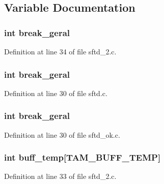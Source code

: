 \subsection{Variable Documentation}
\hypertarget{group__SFTD_gadd34d8f0c83196f8b20622a06ddead79}{
\subsubsection[{break\_\-geral}]{\setlength{\rightskip}{0pt plus 5cm}int {\bf break\_\-geral}}}
\label{group__SFTD_gadd34d8f0c83196f8b20622a06ddead79}


Definition at line 34 of file sftd\_\-2.c.

\hypertarget{group__SFTD_gadd34d8f0c83196f8b20622a06ddead79}{
\subsubsection[{break\_\-geral}]{\setlength{\rightskip}{0pt plus 5cm}int {\bf break\_\-geral}}}
\label{group__SFTD_gadd34d8f0c83196f8b20622a06ddead79}


Definition at line 30 of file sftd.c.

\hypertarget{group__SFTD_gadd34d8f0c83196f8b20622a06ddead79}{
\subsubsection[{break\_\-geral}]{\setlength{\rightskip}{0pt plus 5cm}int {\bf break\_\-geral}}}
\label{group__SFTD_gadd34d8f0c83196f8b20622a06ddead79}


Definition at line 30 of file sftd\_\-ok.c.

\hypertarget{group__SFTD_gaf04e37b7953920f8142c8ebf2b9f7d13}{
\subsubsection[{buff\_\-temp}]{\setlength{\rightskip}{0pt plus 5cm}int {\bf buff\_\-temp}\mbox{[}TAM\_\-BUFF\_\-TEMP\mbox{]}}}
\label{group__SFTD_gaf04e37b7953920f8142c8ebf2b9f7d13}


Definition at line 33 of file sftd\_\-2.c.

